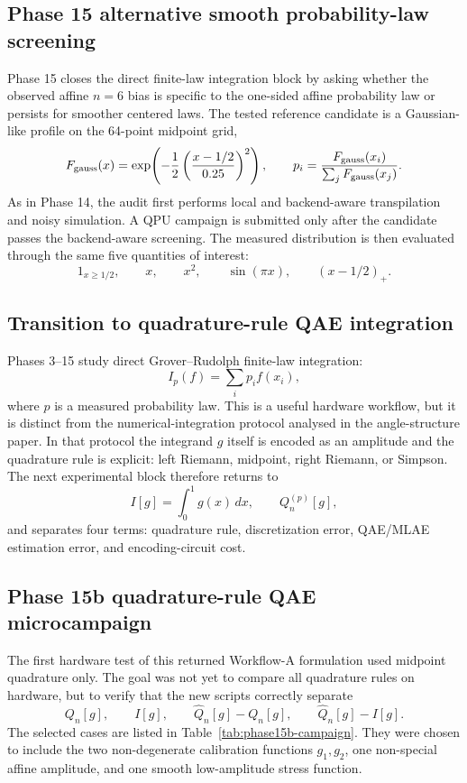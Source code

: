 \subsection{Phase 15 alternative smooth probability-law screening}

Phase 15 closes the direct finite-law integration block by asking whether the
observed affine \(n=6\) bias is specific to the one-sided affine probability
law or persists for smoother centered laws. The tested reference candidate is a
Gaussian-like profile on the 64-point midpoint grid,
\[
  F_{\rm gauss}(x)=
  \exp\!\left(-\frac{1}{2}\left(\frac{x-1/2}{0.25}\right)^2\right),
  \qquad
  p_i=\frac{F_{\rm gauss}(x_i)}{\sum_j F_{\rm gauss}(x_j)} .
\]
As in Phase 14, the audit first performs local and backend-aware transpilation
and noisy simulation. A QPU campaign is submitted only after the candidate
passes the backend-aware screening. The measured distribution is then evaluated
through the same five quantities of interest:
\[
  1_{x\ge 1/2},\qquad x,\qquad x^2,\qquad \sin(\pi x),\qquad (x-1/2)_+ .
\]

\subsection{Transition to quadrature-rule QAE integration}

Phases 3--15 study direct Grover--Rudolph finite-law integration:
\[
  I_p(f)=\sum_i p_i f(x_i),
\]
where \(p\) is a measured probability law. This is a useful hardware workflow,
but it is distinct from the numerical-integration protocol analysed in the
angle-structure paper. In that protocol the integrand \(g\) itself is encoded
as an amplitude and the quadrature rule is explicit: left Riemann, midpoint,
right Riemann, or Simpson. The next experimental block therefore returns to
\[
  I[g]=\int_0^1 g(x)\,dx,\qquad Q_n^{(p)}[g],
\]
and separates four terms: quadrature rule, discretization error, QAE/MLAE
estimation error, and encoding-circuit cost.

\subsection{Phase 15b quadrature-rule QAE microcampaign}
\label{subsec:phase15b-quadrature-microcampaign}

The first hardware test of this returned Workflow-A formulation used midpoint
quadrature only. The goal was not yet to compare all quadrature rules on
hardware, but to verify that the new scripts correctly separate
\[
  Q_n[g],\qquad I[g],\qquad
  \widehat Q_n[g]-Q_n[g],\qquad
  \widehat Q_n[g]-I[g].
\]
The selected cases are listed in Table~\ref{tab:phase15b-campaign}. They were
chosen to include the two non-degenerate calibration functions \(g_1,g_2\), one
non-special affine amplitude, and one smooth low-amplitude stress function.

